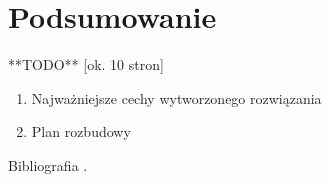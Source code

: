 \clearpage
\section{Podsumowanie}

**TODO** [ok. 10 stron]

\begin{enumerate}
    \item Najważniejsze cechy wytworzonego rozwiązania
    \item Plan rozbudowy
\end{enumerate}

    Bibliografia \cite{knuth1984texbook}.